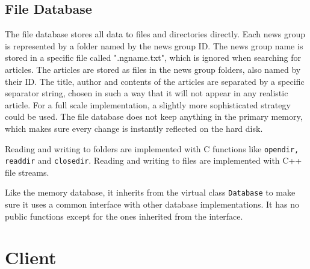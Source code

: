 \documentclass{acmsiggraph}               %
\begin{document}
\subsection{File Database}
\label{ssec:file_db}
The file database stores all data to files and directories directly. Each news group is represented
by a folder named by the news group ID. The news group name is stored in a specific file called ".ngname.txt",
which is ignored when searching for articles. The articles are stored as files in the news group folders, 
also named by their ID. The title, author and contents of the articles are separated by a specific separator
string, chosen in such a way that it will not appear in any realistic article. For a full scale implementation, a
slightly more sophisticated strategy could be used. The file database does not keep anything in the primary memory, 
which makes sure every change is instantly reflected on the hard disk. 

Reading and writing to folders are implemented with C functions like \texttt{opendir, readdir} and \texttt{closedir}.
Reading and writing to files are implemented with C++ file streams. 

Like the memory database, it inherits from the virtual class \texttt{Database} to make sure it uses a common 
interface with other database implementations. It has no public functions except for the ones inherited
from the interface.


\section{Client}
\label{sec:client}
\end{document}
